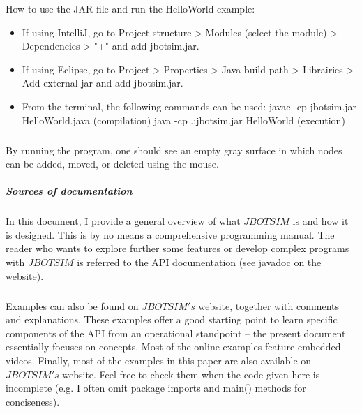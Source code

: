 How to use the JAR file and run the HelloWorld example:
\begin{itemize}
	\item If using IntelliJ, go to Project structure > Modules (select the module) > Dependencies > "+" and add jbotsim.jar.
	\item If using Eclipse, go to Project > Properties > Java build path > Librairies > Add external jar and add jbotsim.jar.
	\item From the terminal, the following commands can be used: javac -cp jbotsim.jar HelloWorld.java (compilation) java -cp .:jbotsim.jar HelloWorld (execution)
\end{itemize}
\subparagraph{}By running the program, one should see an empty gray surface in which nodes can be added, moved, or deleted using the mouse.
\subparagraph{Sources of documentation}In this document, I provide a general overview of what $JBOTSIM$ is and how it is designed. This is by no means a comprehensive programming manual. The reader who wants to explore further some features or develop complex programs with $JBOTSIM$ is referred to the API documentation (see javadoc on the website). \subparagraph{}Examples can also be found on $JBOTSIM's$ website, together with comments and explanations. These examples offer a good starting point to learn specific components of the API from an operational standpoint – the present document essentially focuses on concepts. Most of the online examples feature embedded videos. Finally, most of the examples in this paper are also available on $JBOTSIM's$ website. Feel free to check them when the code given here is incomplete (e.g. I often omit package imports and main() methods for conciseness).
